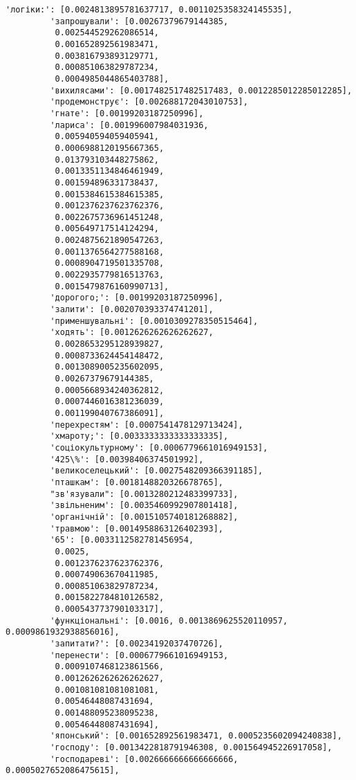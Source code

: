 \documentclass[11pt]{article}
\begin{document}
\begin{Verbatim}[commandchars=\\\{\}]
         'логіки:': [0.0024813895781637717, 0.0011025358324145535],
         'запрошували': [0.00267379679144385,
          0.002544529262086514,
          0.001652892561983471,
          0.003816793893129771,
          0.000851063829787234,
          0.0004985044865403788],
         'вихилясами': [0.0017482517482517483, 0.0012285012285012285],
         'продемонструє': [0.002688172043010753],
         'гнате': [0.00199203187250996],
         'лариса': [0.001996007984031936,
          0.005940594059405941,
          0.0006988120195667365,
          0.013793103448275862,
          0.0013351134846461949,
          0.001594896331738437,
          0.0015384615384615385,
          0.0012376237623762376,
          0.0022675736961451248,
          0.005649717514124294,
          0.0024875621890547263,
          0.0011376564277588168,
          0.0008904719501335708,
          0.0022935779816513763,
          0.0015479876160990713],
         'дорогого;': [0.00199203187250996],
         'залити': [0.002070393374741201],
         'применшувальні': [0.0010309278350515464],
         'ходять': [0.0012626262626262627,
          0.0028653295128939827,
          0.0008733624454148472,
          0.0013089005235602095,
          0.00267379679144385,
          0.0005668934240362812,
          0.0007446016381236039,
          0.001199040767386091],
         'перехрестям': [0.0007541478129713424],
         'хмароту;': [0.0033333333333333335],
         'соціокультурному': [0.0006779661016949153],
         '425\%': [0.00398406374501992],
         'великоселецький': [0.0027548209366391185],
         'пташкам': [0.0018148820326678765],
         "зв'язували": [0.0013280212483399733],
         'звільненим': [0.0035460992907801418],
         'органічній': [0.0015105740181268882],
         'травмою': [0.0014958863126402393],
         '65': [0.0033112582781456954,
          0.0025,
          0.0012376237623762376,
          0.000749063670411985,
          0.000851063829787234,
          0.0015822784810126582,
          0.000543773790103317],
         'функціональні': [0.0016, 0.0013869625520110957, 0.0009861932938856016],
         'запитати?': [0.00234192037470726],
         'перенести': [0.0006779661016949153,
          0.0009107468123861566,
          0.0012626262626262627,
          0.001081081081081081,
          0.00546448087431694,
          0.001488095238095238,
          0.00546448087431694],
         'японський': [0.001652892561983471, 0.0005235602094240838],
         'господу': [0.0013422818791946308, 0.001564945226917058],
         'господареві': [0.0026666666666666666, 0.0005027652086475615],

\end{Verbatim}
\end{document}
